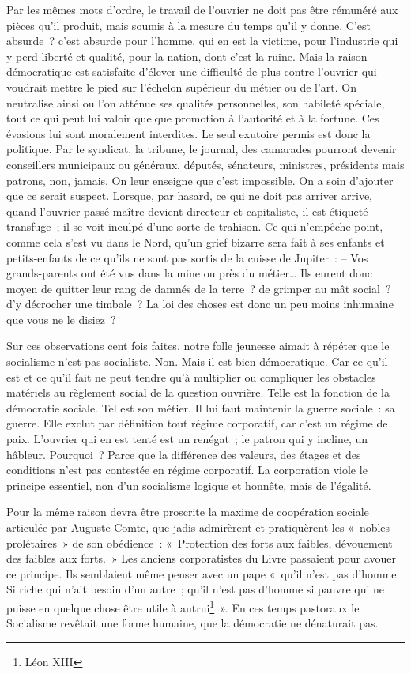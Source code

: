 \documentclass[french,twoside]{book} %
\begin{document}
Par les mêmes mots d’ordre, le travail de l’ouvrier ne doit pas être rémunéré aux pièces qu’il produit, mais soumis à la mesure du temps qu’il y donne. C’est absurde ? c’est absurde pour l’homme, qui en est la victime, pour l’industrie qui y perd liberté et qualité, pour la nation, dont c’est la ruine. Mais la raison démocratique est satisfaite d’élever une difficulté de plus contre l’ouvrier qui voudrait mettre le pied sur l’échelon supérieur du métier ou de l’art. On neutralise ainsi ou l’on atténue ses qualités personnelles, son habileté spéciale, tout ce qui peut lui valoir quelque promotion à l’autorité et à la fortune. Ces évasions lui sont moralement interdites. Le seul exutoire permis est donc la politique. Par le syndicat, la tribune, le journal, des camarades pourront devenir conseillers municipaux ou généraux, députés, sénateurs, ministres, présidents mais patrons, non, jamais. On leur enseigne que c’est impossible. On a soin d’ajouter que ce serait suspect. Lorsque, par hasard, ce qui ne doit pas arriver arrive, quand l’ouvrier passé maître devient directeur et capitaliste, il est étiqueté transfuge ; il se voit inculpé d’une sorte de trahison. Ce qui n’empêche point, comme cela s’est vu dans le Nord, qu’un grief bizarre sera fait à ses enfants et petits-enfants de ce qu’ils ne sont pas sortis de la cuisse de Jupiter : – Vos grands-parents ont été vus dans la mine ou près du métier… Ils eurent donc moyen de quitter leur rang de damnés de la terre ? de grimper au mât social ? d’y décrocher une timbale ? La loi des choses est donc un peu moins inhumaine que vous ne le disiez ?\par
Sur ces observations cent fois faites, notre folle jeunesse aimait à répéter que le socialisme n’est pas socialiste. Non. Mais il est bien démocratique. Car ce qu’il est et ce qu’il fait ne peut tendre qu’à multiplier ou compliquer les obstacles matériels au règlement social de la question ouvrière. Telle est la fonction de la démocratie sociale. Tel est son métier. Il lui faut maintenir la guerre sociale : sa guerre. Elle exclut par définition tout régime corporatif, car c’est un régime de paix. L’ouvrier qui en est tenté est un renégat ; le patron qui y incline, un hâbleur. Pourquoi ? Parce que la différence des valeurs, des étages et des conditions n’est pas contestée en régime corporatif. La corporation viole le principe essentiel, non d’un socialisme logique et honnête, mais de l’égalité.\par
Pour la même raison devra être proscrite la maxime de coopération sociale articulée par Auguste Comte, que jadis admirèrent et pratiquèrent les « nobles prolétaires » de son obédience : « Protection des forts aux faibles, dévouement des faibles aux forts. » Les anciens corporatistes du Livre passaient pour avouer ce principe. Ils semblaient même penser avec un pape « qu’il n’est pas d’homme Si riche qui n’ait besoin d’un autre ; qu’il n’est pas d’homme si pauvre qui ne puisse en quelque chose être utile à autrui\footnote{Léon XIII} ». En ces temps pastoraux le Socialisme revêtait une forme humaine, que la démocratie ne dénaturait pas.\par
\end{document}
